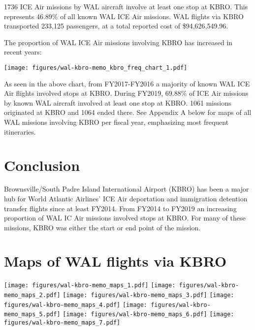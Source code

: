 \documentclass[a4paper,11pt,final]{article}
\begin{document}
1736 ICE Air missions by WAL aircraft involve at least one stop at KBRO.
This represents 46.89\% of all known WAL ICE Air missions. WAL flights
via KBRO transported 233,125 passengers, at a total reported cost of
\$94,626,549.96.

The proportion of WAL ICE Air missions involving KBRO has increased in
recent years:

\texttt{[image: figures/wal-kbro-memo\_kbro\_freq\_chart\_1.pdf]}

As seen in the above chart, from FY2017-FY2016 a majority of known WAL
ICE Air flights involved stops at KBRO. During FY2019, 69.88\% of ICE
Air missions by known WAL aircraft involved at least one stop at KBRO.
1061 missions originated at KBRO and 1064 ended there. See Appendix A
below for maps of all WAL missions involving KBRO per fiscal year,
emphasizing most frequent itineraries.

\section{Conclusion}

Brownsville/South Padre Island International Airport (KBRO) has been a
major hub for World Atlantic Airlines' ICE Air deportation and
immigration detention transfer flights since at least FY2014. From
FY2014 to FY2019 an increasing proportion of WAL IC Air missions
involved stops at KBRO. For many of these missions, KBRO was either the
start or end point of the mission.

\appendix
\section{Maps of WAL flights via KBRO}







\texttt{[image: figures/wal-kbro-memo\_maps\_1.pdf]}
\texttt{[image: figures/wal-kbro-memo\_maps\_2.pdf]}
\texttt{[image: figures/wal-kbro-memo\_maps\_3.pdf]}
\texttt{[image: figures/wal-kbro-memo\_maps\_4.pdf]}
\texttt{[image: figures/wal-kbro-memo\_maps\_5.pdf]}
\texttt{[image: figures/wal-kbro-memo\_maps\_6.pdf]}
\texttt{[image: figures/wal-kbro-memo\_maps\_7.pdf]}
\end{document}
